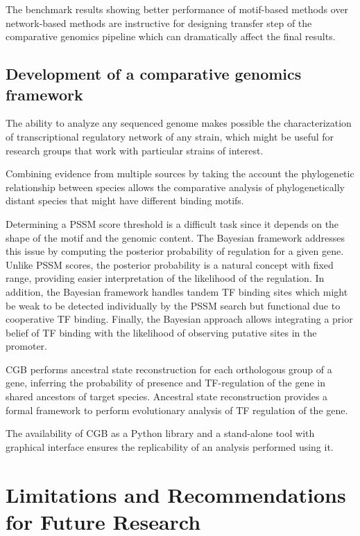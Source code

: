 The benchmark results showing better performance of motif-based methods over
network-based methods are instructive for designing transfer step of the
comparative genomics pipeline which can dramatically affect the final results.

\subsection{Development of a comparative genomics framework}

The ability to analyze any sequenced genome makes possible the characterization
of transcriptional regulatory network of any strain, which might be useful for
research groups that work with particular strains of interest.

Combining evidence from multiple sources by taking the account the phylogenetic
relationship between species allows the comparative analysis of
phylogenetically distant species that might have different binding motifs.

Determining a PSSM score threshold is a difficult task since it depends on the
shape of the motif and the genomic content. The Bayesian framework addresses
this issue by computing the posterior probability of regulation for a given
gene. Unlike PSSM scores, the posterior probability is a natural concept with
fixed range, providing easier interpretation of the likelihood of the
regulation. In addition, the Bayesian framework handles tandem TF binding sites
which might be weak to be detected individually by the PSSM search but
functional due to cooperative TF binding. Finally, the Bayesian approach allows
integrating a prior belief of TF binding with the likelihood of observing
putative sites in the promoter.

CGB performs ancestral state reconstruction for each orthologous group of a
gene, inferring the probability of presence and TF-regulation of the gene in
shared ancestors of target species. Ancestral state reconstruction provides a
formal framework to perform evolutionary analysis of TF regulation of the gene.

The availability of CGB as a Python library and a stand-alone tool with
graphical interface ensures the replicability of an analysis performed using
it.

\section{Limitations and Recommendations for Future Research}

